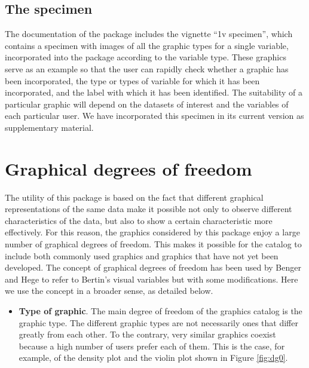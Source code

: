\hypertarget{the-specimen}{%
	\subsection{The specimen}\label{the-specimen}}

The documentation of the package includes the vignette ``1v specimen'',
which contains a specimen with images of all the graphic types for a
single variable, incorporated into the package according to the variable
type. These graphics serve as an example so that the user can rapidly
check whether a graphic has been incorporated, the type or types of
variable for which it has been incorporated, and the label with which it
has been identified. The suitability of a particular graphic will depend
on the datasets of interest and the variables of each particular user.
We have incorporated this specimen in its current version as
supplementary material.

\hypertarget{graphical-degrees-of-freedom}{%
	\section{Graphical degrees of
freedom}\label{graphical-degrees-of-freedom}}

The utility of this package is based on the fact that different
graphical representations of the same data make it possible not only to
observe different characteristics of the data, but also to show a
certain characteristic more effectively. For this reason, the graphics
considered by this package enjoy a large number of graphical degrees of
freedom. This makes it possible for the catalog to include both commonly
used graphics and graphics that have not yet been developed. The concept
of graphical degrees of freedom has been used by Benger and Hege
\citeyearpar{Benger2006} to refer to Bertin's visual variables
\citeyearpar[p.43]{Bertin1967} but with some modifications. Here we use
the concept in a broader sense, as detailed below.

\begin{itemize}
	\tightlist
	\item
	\textbf{Type of graphic}. The main degree of freedom of the graphics
	catalog is the graphic type. The different graphic types are not
	necessarily ones that differ greatly from each other. To the contrary,
	very similar graphics coexist because a high number of users prefer
	each of them. This is the case, for example, of the density plot and
	the violin plot shown in Figure \ref{fig:dg0}.
\end{itemize}


